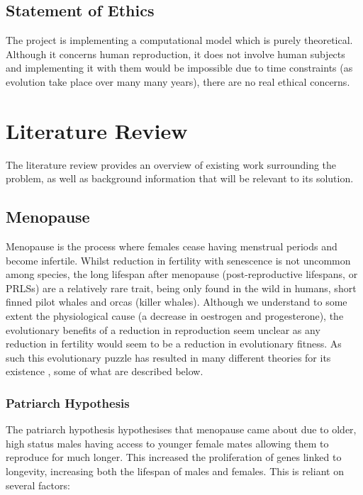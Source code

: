 \documentclass[authoryearcitations]{UoYCSproject}
\begin{document}
\section{Statement of Ethics}
The project is implementing a computational model which is purely theoretical. Although it concerns human reproduction, it does not involve human subjects and implementing it with them would be impossible due to time constraints (as evolution take place over many many years), there are no real ethical concerns.

\chapter{Literature Review}
\label{cha:Literature Review}
The literature review provides an overview of existing work surrounding the problem, as well as background information that will be relevant to its solution. 

\section{Menopause}
Menopause is the process where females cease having menstrual periods and become infertile. Whilst reduction in fertility with senescence is not uncommon among species, the long lifespan after menopause (post-reproductive lifespans, or PRLSs) are a relatively rare trait, being only found in the wild in humans, short finned pilot whales and orcas (killer whales). Although we understand to some extent the physiological cause (a decrease in oestrogen and progesterone), the evolutionary benefits of a reduction in reproduction seem unclear as any reduction in fertility would seem to be a reduction in evolutionary fitness. As such this evolutionary puzzle has resulted in many different theories for its existence \cite{evolutionPRLS2015}, some of what are described below.  

\subsection{Patriarch Hypothesis}
The patriarch hypothesis \cite{patriarchHypothesis2000} hypothesises that menopause came about due to older, high status males having access to younger female mates allowing them to reproduce for much longer. This increased the proliferation of genes linked to longevity, increasing both the lifespan of males and females. This is reliant on several factors: 
\end{document}
